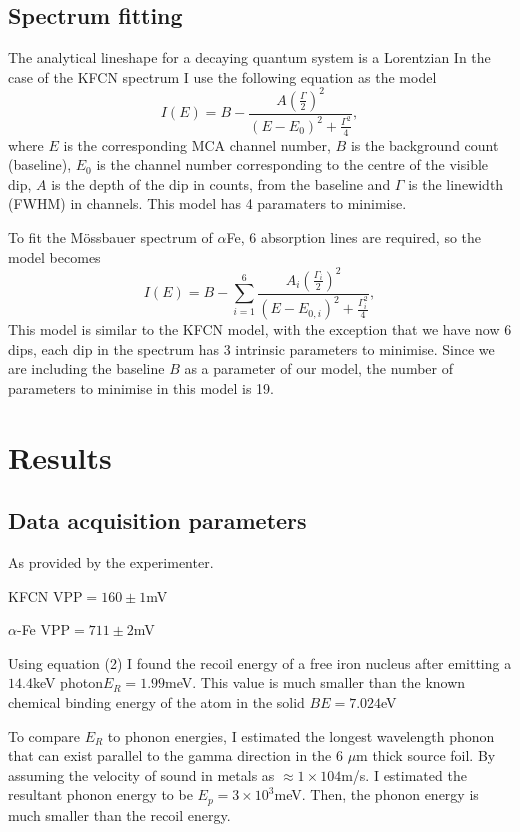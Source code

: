 \documentclass[a4paper, twocolumn]{article}
\newenvironment{itemizeReduced}{
\begin{list}{\labelitemi}{\leftmargin=1em}
\setlength{\itemsep}{1pt}
\setlength{\parskip}{0pt}
\setlength{\parsep}{0pt}}{\end{list}
}
\begin{document}
\subsection{Spectrum fitting}
The analytical lineshape for a decaying quantum system is a Lorentzian\cite{0}
In the case of the KFCN spectrum I use the following equation as the model
\begin{equation} I(E) = B - \frac{A(\frac{\Gamma}{2})^2}{(E - E_0)^2 + \frac{\Gamma^2}{4}},
\end{equation}
where $E$ is the corresponding MCA channel number, $B$ is the background count (baseline), $E_0$ is the channel number corresponding to the centre of the visible dip, $A$ is the depth of the dip in counts, from the baseline and $\Gamma$ is the linewidth (FWHM) in channels\cite{0}.
This model has 4 paramaters to minimise.

To fit the Mössbauer spectrum of $\alpha$Fe, 6 absorption lines are required, so the model becomes
\begin{equation} I(E) = B - \sum_{i=1}^{6}\frac{A_i(\frac{\Gamma_i}{2})^2}{(E - E_{0,i})^2 + \frac{\Gamma_{i}^2}{4}},
\end{equation}
This model is similar to the KFCN model, with the exception that we have now 6 dips, each dip in the spectrum has 3 intrinsic parameters to minimise. Since we are including the baseline $B$ as a parameter of our model, the number of parameters to minimise in this model is 19.

\clearpage
\onecolumn
\section{Results}
\subsection{Data acquisition parameters}
As provided by the experimenter.
\begin{itemizeReduced}
    \item KFCN VPP$=160\pm1$mV
    \item $\alpha$-Fe VPP$=711\pm2$mV
\end{itemizeReduced}

Using equation (2) I found the recoil energy of a free iron nucleus after emitting a $14.4$keV photon$ E_R = 1.99$meV. 
This value is much smaller than the known chemical binding energy of the atom in the solid $BE = 7.024$eV\cite{11}

To compare $E_R$ to phonon energies, I estimated the longest wavelength phonon that can exist parallel to the gamma direction in the 6 \textrm{$\mu$}m thick source foil. By assuming the velocity of sound in metals as $\approx 1\times104$m/s\cite{0}. I estimated the resultant phonon energy to be $E_p = 3\times10^3$meV. Then, the phonon energy is much smaller than the recoil energy.
\end{document}
